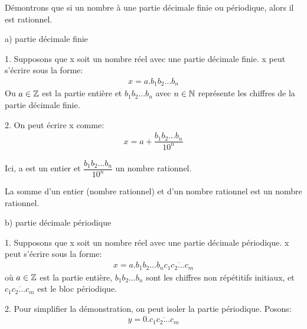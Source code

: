 \documentclass[a4paper, 12pt]{article}
\begin{document}
\begin{demonstration}
    Démontrons que si un nombre à une partie décimale finie ou périodique, alors il est rationnel.

    \vspace{1em}

    a) partie décimale finie

    \vspace{0.5em}

    1. Supposons que x soit un nombre réel avec une partie décimale finie.
    x peut s'écrire sous la forme:
    \begin{align*}
        x = a.b_1b_2...b_n
    \end{align*}
    Ou $a \in \mathbb{Z}$ est la partie entière et $b_1b_2...b_n$ avec $n \in \mathbb{N}$ représente les chiffres de la partie décimale finie.
    
    \vspace{0.5em}

    2. On peut écrire x comme:
    \begin{align*}
        x = a + \dfrac{b_1b_2...b_n}{10^n}
    \end{align*}

    Ici, a est un entier et $\dfrac{b_1b_2...b_n}{10^n}$ un nombre rationnel.

    La somme d'un entier (nombre rationnel) et d'un nombre rationnel est un nombre rationnel.

    \vspace{1em}

    b) partie décimale périodique

    \vspace{0.5em}

    1. Supposons que x soit un nombre réel avec une partie décimale périodique.
    x peut s'écrire sous la forme:
    \begin{align*}
        x = a.b_1b_2...b_n\overline{c_1c_2...c_m}
    \end{align*}
    où $a \in \mathbb{Z}$ est la partie entière, $b_1b_2...b_n$ sont les chiffres non répétitifs initiaux, et
    $\overline{c_1c_2...c_m}$ est le bloc périodique.

    \vspace{0.5em}

    2. Pour simplifier la démonstration, on peut isoler la partie périodique. Posons:
    \begin{align*}
        y = 0.\overline{c_1c_2...c_m}
    \end{align*}
    \vspace{0.5em}
    

\end{demonstration}
\end{document}
